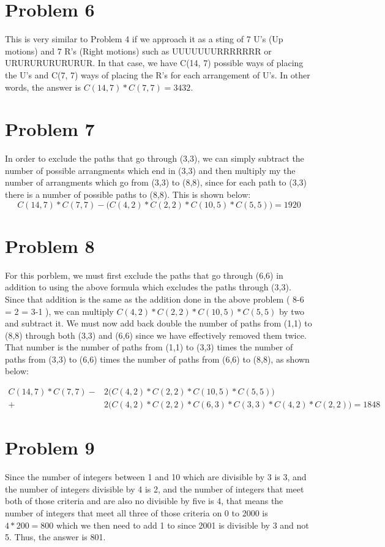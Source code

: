 \documentclass[11pt]{article}
\begin{document}
\section*{Problem 6}
This is very similar to Problem 4 if we approach it as a sting of 7 U's (Up motions) and 7 R's (Right motions) such as UUUUUUURRRRRRR or URURURURURURUR. In that case, we have C(14, 7) possible ways of placing the U's and C(7, 7) ways of placing the R's for each arrangement of U's. In other words, the answer is $C(14, 7) * C(7, 7) = 3432$.

\section*{Problem 7}
In order to exclude the paths that go through (3,3), we can simply subtract the number of possible arrangments which end in (3,3) and then multiply my the number of arrangments which go from (3,3) to (8,8), since for each path to (3,3) there is a number of possible paths to (8,8). This is shown below:
\[C(14, 7) * C(7, 7) - \Big(C(4, 2) * C(2, 2) * C(10, 5) * C(5, 5)\Big) = 1920\]

\section*{Problem 8}
For this porblem, we must first exclude the paths that go through (6,6) in addition to using the above formula which excludes the paths through (3,3). Since that addition is the same as the addition done in the above problem ( 8-6 = 2 = 3-1 ), we can multiply $C(4, 2) * C(2, 2) * C(10, 5) * C(5, 5)$ by two and subtract it. We must now add back double the number of paths from (1,1) to (8,8) through both (3,3) and (6,6) since we have effectively removed them twice. That number is the number of paths from (1,1) to (3,3) times the number of paths from (3,3) to (6,6) times the number of paths from (6,6) to (8,8), as shown below:
\begin{center}
\begin{align}
C(14, 7) * C(7, 7) - &2\Big(C(4, 2) * C(2, 2) * C(10, 5) * C(5, 5)\Big) \\ + &2\Big(C(4, 2) * C(2, 2) * C(6, 3) * C(3, 3) * C(4, 2) * C(2, 2)\Big) = 1848
\end{align}
\end{center}

\section*{Problem 9}
Since the number of integers between 1 and 10 which are divisible by 3 is 3, and the number of integers divisible by 4 is 2, and the number of integers that meet both of those criteria and are also no divisible by five is 4, that means the number of integers that meet all three of those criteria on 0 to 2000 is $4 *200 = 800$ which we then need to add 1 to since 2001 is divisible by 3 and not 5. Thus, the answer is 801.
\end{document}

